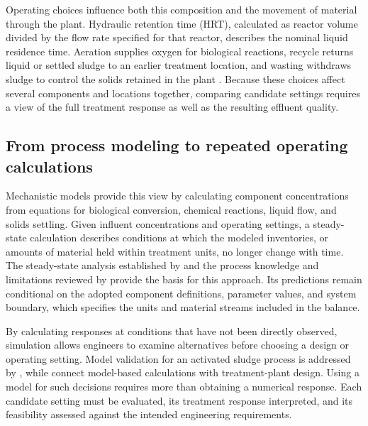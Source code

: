 Operating choices influence both this composition and the movement of material through the plant. Hydraulic retention time (HRT), calculated as reactor volume divided by the flow rate specified for that reactor, describes the nominal liquid residence time. Aeration supplies oxygen for biological reactions, recycle returns liquid or settled sludge to an earlier treatment location, and wasting withdraws sludge to control the solids retained in the plant \citep{Henze2008}. Because these choices affect several components and locations together, comparing candidate settings requires a view of the full treatment response as well as the resulting effluent quality.

\subsection{From process modeling to repeated operating calculations}

Mechanistic models provide this view by calculating component concentrations from equations for biological conversion, chemical reactions, liquid flow, and solids settling. Given influent concentrations and operating settings, a steady-state calculation describes conditions at which the modeled inventories, or amounts of material held within treatment units, no longer change with time. The steady-state analysis established by \citet{Marais1976} and the process knowledge and limitations reviewed by \citet{Hauduc2013} provide the basis for this approach. Its predictions remain conditional on the adopted component definitions, parameter values, and system boundary, which specifies the units and material streams included in the balance.

By calculating responses at conditions that have not been directly observed, simulation allows engineers to examine alternatives before choosing a design or operating setting. Model validation for an activated sludge process is addressed by \citet{Calise2020}, while \citet{Rivas2008} connect model-based calculations with treatment-plant design. Using a model for such decisions requires more than obtaining a numerical response. Each candidate setting must be evaluated, its treatment response interpreted, and its feasibility assessed against the intended engineering requirements.

